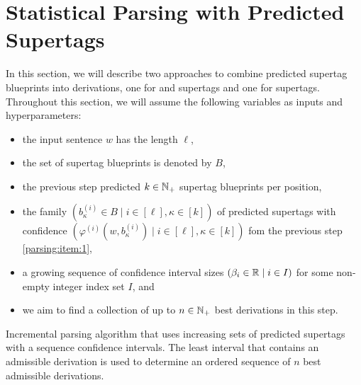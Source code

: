 \documentclass[../../document.tex]{subfiles}
\begin{document}
    \section{Statistical Parsing with Predicted Supertags}\label{sec:parsing}
    In this section, we will describe two approaches to combine predicted supertag blueprints into derivations, one for  and  supertags and one for  supertags.
    Throughout this section, we will assume the following variables as inputs and hyperparameters:
    \begin{itemize}
        \item the input sentence \(w\) has the length \(\ell\),
        \item the set of supertag blueprints is denoted by \(B\),
        \item the previous step predicted \(k \in \mathbb{N}_+\) supertag blueprints per position,
        \item the family \((b^{(i)}_{\kappa} \in B \mid i \in [\ell], \kappa \in [k])\) of predicted supertags with confidence \((\varphi^{(i)}(w, b^{(i)}_{\kappa}) \mid i \in [\ell], \kappa \in [k])\) fom the previous step \ref{parsing:item:1},
        \item a growing sequence of confidence interval sizes \((\beta_i \in \mathbb{R} \mid i \in I)\) for some non-empty integer index set \(I\), and
        \item we aim to find a collection of up to \(n \in \mathbb{N}_+\) best derivations in this step.
    \end{itemize}

    \begin{algorithm}[t]
        \caption{\label{alg:parsing:incremental}
            Incremental parsing algorithm that uses increasing sets of predicted supertags with a sequence confidence intervals.
            The least interval that contains an admissible derivation is used to determine an ordered sequence of \(n\) best admissible derivations.
        }
        
    \end{algorithm}
\end{document}
